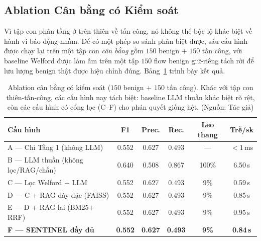 \subsection{Ablation Cân bằng có Kiểm soát}
Vì tập con phân tầng ở trên thiên về tấn công, nó không thể bộc lộ khác biệt về hành vi báo động nhầm. Để có một phép so sánh phân biệt được, sáu cấu hình được chạy lại trên một tập con \emph{cân bằng} gồm $150$ benign $+$ $150$ tấn công, với baseline Welford được làm ấm trên một tập $150$ flow benign giữ-riêng tách rời để lưu lượng benign thật được hiệu chỉnh đúng. Bảng~\ref{tab:ablation_balanced} trình bày kết quả.

\begin{table}[!htbp]
    \centering
    \footnotesize
    \setlength{\tabcolsep}{4pt}
    \caption{Ablation cân bằng có kiểm soát ($150$ benign $+$ $150$ tấn công). Khác với tập con thiên-tấn-công, các cấu hình nay tách biệt: baseline LLM thuần khác biệt rõ rệt, còn các cấu hình có cổng lọc (C--F) cho phán quyết giống hệt. (Nguồn: Tác giả)}
    \label{tab:ablation_balanced}
    \begin{tabular}{|>{\raggedright\arraybackslash}p{}|c|c|c|c|c|}
        \hline
        \textbf{Cấu hình} & \textbf{F1} & \textbf{Prec.} & \textbf{Rec.} & \textbf{Leo thang} & \textbf{Trễ/sk} \\
        \hline
        A --- Chỉ Tầng 1 (không LLM) & 0.552 & 0.627 & 0.493 & --- & $<1$\,ms \\
        \hline
        B --- LLM thuần (không lọc/RAG/chắn) & 0.640 & 0.508 & 0.867 & 100\% & 6.50\,s \\
        \hline
        C --- Lọc Welford $+$ LLM & 0.552 & 0.627 & 0.493 & 9\% & 0.59\,s \\
        \hline
        D --- C $+$ RAG dày đặc (FAISS) & 0.552 & 0.627 & 0.493 & 9\% & 0.85\,s \\
        \hline
        E --- D $+$ RAG lai (BM25$+$RRF) & 0.552 & 0.627 & 0.493 & 9\% & 0.95\,s \\
        \hline
        \textbf{F --- SENTINEL đầy đủ} & \textbf{0.552} & \textbf{0.627} & \textbf{0.493} & \textbf{9\%} & \textbf{0.84\,s} \\
        \hline
    \end{tabular}
\end{table}

